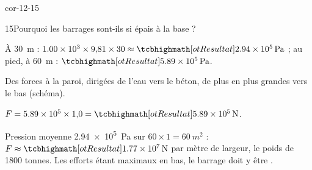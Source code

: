 \begin{blocLivre}{cor-12-15}
\begin{corrige}{15}{Pourquoi les barrages sont-ils si épais à la base ?}
\begin{questions}
\item À \qty{30}{m} : $\num{1,00e3}\times9{,}81\times30\approx\res{\qty{2,94e5}{Pa}}$ ; au pied, à \qty{60}{m} : $\res{\qty{5,89e5}{Pa}}$.
\item Des forces  à la paroi, dirigées de l'eau vers le béton, de plus en plus grandes vers le bas (schéma).
\item $F=\num{5,89e5}\times1{,}0=\res{\qty{5,89e5}{N}}$.
\item Pression moyenne \qty{2,94e5}{Pa} sur $60\times1=\qty{60}{m^2}$ : $F\approx\res{\qty{1,77e7}{N}}$ par mètre de largeur, le poids de \num{1800} tonnes. Les
efforts étant maximaux en bas, le barrage doit y être .
\end{questions}
\end{corrige}
\end{blocLivre}

